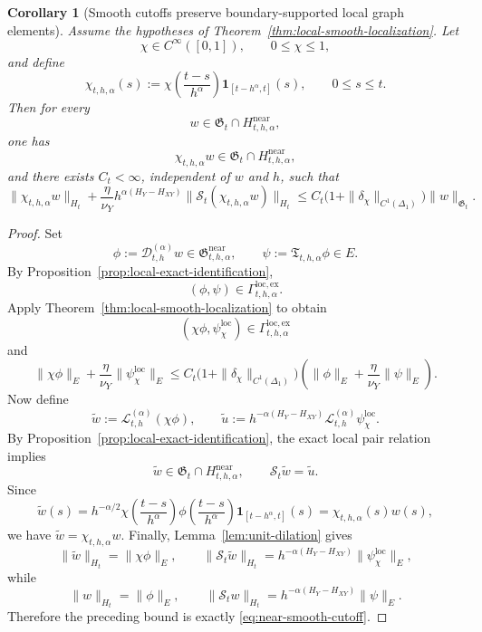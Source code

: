 \documentclass[11pt,a4paper]{amsart}
\theoremstyle{plain}
\newtheorem{corollary}[theorem]{Corollary}
\theoremstyle{definition}
\theoremstyle{remark}
\newcommand{\one}{\mathbf 1}
\begin{document}
\begin{corollary}[Smooth cutoffs preserve boundary-supported local graph elements]
\label{cor:near-smooth-cutoff}
Assume the hypotheses of Theorem~\ref{thm:local-smooth-localization}. Let
\[
\chi\in C^\infty([0,1]),
\qquad
0\le \chi\le 1,
\]
and define
\[
\chi_{t,h,\alpha}(s)
:=
\chi\!\left(\frac{t-s}{h^\alpha}\right)\one_{[t-h^\alpha,t]}(s),
\qquad 0\le s\le t.
\]
Then for every
\[
w\in \mathfrak G_t\cap H_{t,h,\alpha}^{\mathrm{near}},
\]
one has
\[
\chi_{t,h,\alpha}w\in \mathfrak G_t\cap H_{t,h,\alpha}^{\mathrm{near}},
\]
and there exists \(C_t<\infty\), independent of \(w\) and \(h\), such that
\begin{equation}\label{eq:near-smooth-cutoff}
\|\chi_{t,h,\alpha}w\|_{H_t}
+\frac{\eta}{\nu_Y}h^{\alpha(H_Y-H_{XY})}
\|\mathcal S_t(\chi_{t,h,\alpha}w)\|_{H_t}
\le
C_t\bigl(1+\|\delta_\chi\|_{C^1(\Delta_1)}\bigr)\|w\|_{\mathfrak G_t}.
\end{equation}
\end{corollary}

\begin{proof}
Set
\[
\phi:=\mathcal D_{t,h}^{(\alpha)}w\in \mathfrak G_{t,h,\alpha}^{\mathrm{near}},
\qquad
\psi:=\mathfrak T_{t,h,\alpha}\phi\in E.
\]
By Proposition~\ref{prop:local-exact-identification},
\[
(\phi,\psi)\in \Gamma_{t,h,\alpha}^{\mathrm{loc,ex}}.
\]
Apply Theorem~\ref{thm:local-smooth-localization} to obtain
\[
(\chi\phi,\psi_{\chi}^{\mathrm{loc}})
\in
\Gamma_{t,h,\alpha}^{\mathrm{loc,ex}}
\]
and
\[
\|\chi\phi\|_E+\frac{\eta}{\nu_Y}\|\psi_{\chi}^{\mathrm{loc}}\|_E
\le
C_t\bigl(1+\|\delta_\chi\|_{C^1(\Delta_1)}\bigr)
\left(
\|\phi\|_E+\frac{\eta}{\nu_Y}\|\psi\|_E
\right).
\]
Now define
\[
\widetilde w:=\mathcal L_{t,h}^{(\alpha)}(\chi\phi),
\qquad
\widetilde u:=h^{-\alpha(H_Y-H_{XY})}\mathcal L_{t,h}^{(\alpha)}\psi_{\chi}^{\mathrm{loc}}.
\]
By Proposition~\ref{prop:local-exact-identification}, the exact local pair relation implies
\[
\widetilde w\in \mathfrak G_t\cap H_{t,h,\alpha}^{\mathrm{near}},
\qquad
\mathcal S_t\widetilde w=\widetilde u.
\]
Since
\[
\widetilde w(s)
=
h^{-\alpha/2}\chi\!\left(\frac{t-s}{h^\alpha}\right)\phi\!\left(\frac{t-s}{h^\alpha}\right)
\one_{[t-h^\alpha,t]}(s)
=
\chi_{t,h,\alpha}(s)w(s),
\]
we have \(\widetilde w=\chi_{t,h,\alpha}w\). Finally,
Lemma~\ref{lem:unit-dilation} gives
\[
\|\widetilde w\|_{H_t}=\|\chi\phi\|_E,
\qquad
\|\mathcal S_t\widetilde w\|_{H_t}
=
h^{-\alpha(H_Y-H_{XY})}\|\psi_{\chi}^{\mathrm{loc}}\|_E,
\]
while
\[
\|w\|_{H_t}=\|\phi\|_E,
\qquad
\|\mathcal S_t w\|_{H_t}
=
h^{-\alpha(H_Y-H_{XY})}\|\psi\|_E.
\]
Therefore the preceding bound is exactly \eqref{eq:near-smooth-cutoff}.
\end{proof}
\end{document}
